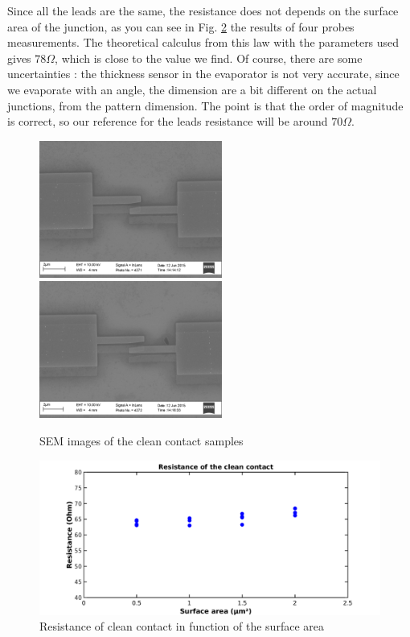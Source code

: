                 Since all the leads are the same, the resistance does not depends on the surface area of the junction, as you can see in Fig. \ref{cleancontact} the results of four probes measurements.
                The theoretical calculus from this law with the parameters used gives $78\Omega$, which is close to the value we find. Of course, there are some uncertainties : the thickness sensor in the evaporator is not very accurate, since we evaporate with an angle, the dimension are a bit different on the actual junctions, from the pattern dimension. The point is that the order of magnitude is correct, so our reference for the leads resistance will be around $70\Omega$.
                \begin{figure}
                    \centering
                    \includegraphics[width=6cm]{SEMtest12_1.png}
                    \includegraphics[width=6cm]{SEMtest12_2.png}
                    \caption{SEM images of the clean contact samples}
                    \label{SEMcleancontact}
                \end{figure}
                
                \begin{figure}
                    \centering
                    \includegraphics[width=12cm]{Rclean.png}
                    \caption{Resistance of clean contact in function of the surface area}
                    \label{cleancontact}
                \end{figure}
                
